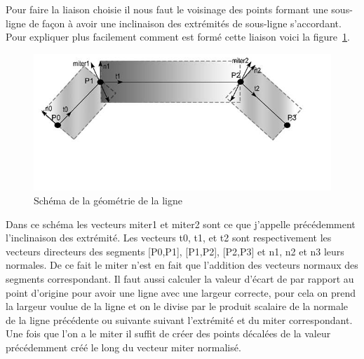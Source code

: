 \documentclass[12pt]{article}
\begin{document}
Pour faire la liaison choisie il nous faut le voisinage des points formant une sous-ligne de façon à avoir une inclinaison des extrémités de sous-ligne s’accordant. Pour expliquer plus facilement comment est formé cette liaison voici la figure~\ref{fig:geom_line}.


\begin{figure}[htp]
  \centering
  \includegraphics[scale=0.8]{images/line_geom}
  \caption{Schéma de la géométrie de la ligne}
  \label{fig:geom_line}
\end{figure}

Dans ce schéma les vecteurs miter1 et miter2 sont ce que j’appelle précédemment l’inclinaison des extrémité. Les vecteurs t0, t1, et t2 sont respectivement les vecteurs directeurs des segments [P0,P1], [P1,P2], [P2,P3] et n1, n2 et n3 leurs normales. De ce fait le miter n’est en fait que l’addition des vecteurs normaux des segments correspondant. Il faut aussi calculer la valeur d’écart de par rapport au point d’origine pour avoir une ligne avec une largeur correcte, pour cela on prend la largeur voulue de la ligne et on le divise par le produit scalaire de la normale de la ligne précédente ou suivante suivant l’extrémité et du miter correspondant. Une fois que l’on a le miter il suffit de créer des points décalées de la valeur précédemment créé le long du vecteur miter normalisé.
\end{document}
